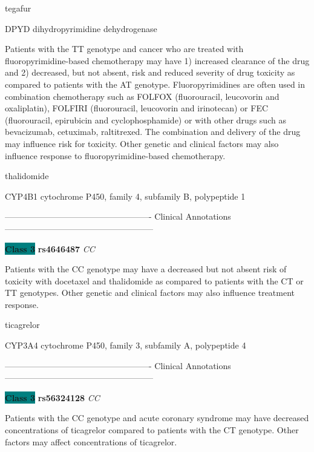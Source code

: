 \documentclass{resume} %
\begin{document}
\begin{rSection}{ tegafur }
\begin{rSubsection}{ DPYD }{ dihydropyrimidine dehydrogenase }{}{}
\item[] Patients with the TT genotype and cancer who are treated with fluoropyrimidine-based chemotherapy may have 1) increased clearance of the drug and 2) decreased, but not absent, risk and reduced severity of drug toxicity as compared to patients with the AT genotype. Fluoropyrimidines are often used in combination chemotherapy such as FOLFOX (fluorouracil, leucovorin and oxaliplatin), FOLFIRI (fluorouracil, leucovorin and irinotecan) or FEC (fluorouracil, epirubicin and cyclophosphamide) or with other drugs such as bevacizumab, cetuximab, raltitrexed. The combination and delivery of the drug may influence risk for toxicity. Other genetic and clinical factors may also influence response to fluoropyrimidine-based chemotherapy.
\end{rSubsection}

\end{rSection}\begin{rSection}{ thalidomide }
\item[]

\begin{rSubsection}{ CYP4B1 }{ cytochrome P450, family 4, subfamily B, polypeptide 1 }{}{}
\item[]

\item[] ---------------------------------------------------- Clinical Annotations -----------------------------------------------------\newline
\item \textbf{\colorbox{teal} {Class 3}} \textbf{ rs4646487 } \textit{ CC }
\item[] Patients with the CC genotype may have a decreased but not absent risk of toxicity with docetaxel and thalidomide as compared to patients with the CT or TT genotypes. Other genetic and clinical factors may also influence treatment response.
\end{rSubsection}

\end{rSection}\begin{rSection}{ ticagrelor }
\item[]

\begin{rSubsection}{ CYP3A4 }{ cytochrome P450, family 3, subfamily A, polypeptide 4 }{}{}
\item[]

\item[] ---------------------------------------------------- Clinical Annotations -----------------------------------------------------\newline
\item \textbf{\colorbox{teal} {Class 3}} \textbf{ rs56324128 } \textit{ CC }
\item[] Patients with the CC genotype and acute coronary syndrome may have decreased concentrations of ticagrelor compared to patients with the CT genotype. Other factors may affect concentrations of ticagrelor.
\end{rSubsection}


\end{rSection}
\end{document}
